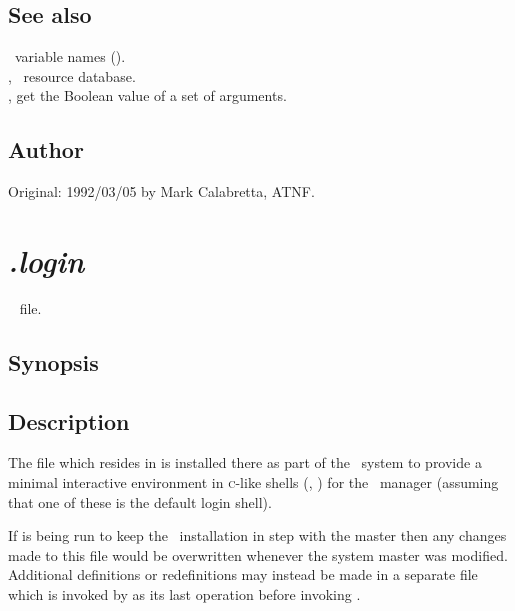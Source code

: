 \subsection*{See also}

\aipspp\ variable names ().\\
, \aipspp\ resource database.\\
, get the Boolean value of a set of arguments.

\subsection*{Author}

Original: 1992/03/05 by Mark Calabretta, ATNF.


\newpage
\section{\textit{.login}}
\label{.login}

\aipspp\  file.

\subsection*{Synopsis}

\begin{synopsis}
\end{synopsis}

\subsection*{Description}

The  file which resides in  is installed there
as part of the \aipspp\ system to provide a minimal interactive environment
in \textsc{c}-like shells (, ) for the \aipspp\ 
manager (assuming that one of these is the default login shell).

If  is being run to keep the \aipspp\ installation in step with
the master then any changes made to this file would be overwritten whenever
the system master was modified.  Additional definitions or redefinitions may
instead be made in a separate \file{.login\_local} file which is invoked by
\filref{.login} as its last operation before invoking
.

